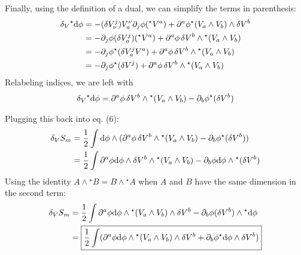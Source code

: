 \documentclass[12pt]{article}
\newcommand{\hodge}{{^\star}}
\begin{document}
Finally, using the definition of a dual, we can simplify the terms in parenthesis:
\begin{align*}
  \var_V\hodge\dd\phi &= -(\var V^j_\nu)V^\nu_a \partial_j\phi (\hodge V^a) + \partial^a\phi \hodge(V_a \wedge V_b) \wedge \var{V^b} \\
  &= -\partial_j\phi (\var V^j_a) (\hodge V^a) + \partial^a\phi \var{V^b} \wedge \hodge(V_a \wedge V_b) \\
  &= -\partial_j\phi \hodge(\var V^j_a V^a) + \partial^a\phi \var{V^b} \wedge \hodge(V_a \wedge V_b) \\
  &= -\partial_j\phi \hodge(\var V^j) + \partial^a\phi \var{V^b} \wedge \hodge(V_a \wedge V_b) \\
\end{align*}
Relabeling indices, we are left with
\begin{align}
  \var_V\hodge\dd\phi = \partial^a\phi \var{V^b} \wedge \hodge(V_a \wedge V_b) -\partial_b\phi \hodge(\var V^b)
\end{align}

Plugging this back into eq. (6):
\begin{align*}
  \var_V{S_m} &= \frac{1}{2} \int \dd\phi \wedge (\partial^a\phi \var{V^b} \wedge \hodge(V_a \wedge V_b) -\partial_b\phi \hodge(\var V^b)) \\
   &= \frac{1}{2} \int \partial^a\phi \dd\phi \wedge \var{V^b} \wedge \hodge(V_a \wedge V_b) - \partial_b\phi \dd\phi \wedge \hodge(\var V^b) \\
\end{align*}
Using the identity $A \wedge \hodge B = B \wedge \hodge A$ when $A$ and $B$ have the same dimension in the second term:
\begin{align}
  \var_V{S_m} &= \frac{1}{2} \int \partial^a\phi \dd\phi \wedge \hodge(V_a \wedge V_b) \wedge \var{V^b} - \partial_b\phi (\var V^b) \wedge \hodge\dd\phi \nonumber \\
  &= \boxed{\frac{1}{2} \int (\partial^a\phi \dd\phi \wedge \hodge(V_a \wedge V_b) \wedge \var{V^b} + \partial_b\phi \hodge\dd\phi \wedge \var{V^b})}
\end{align}
\end{document}
